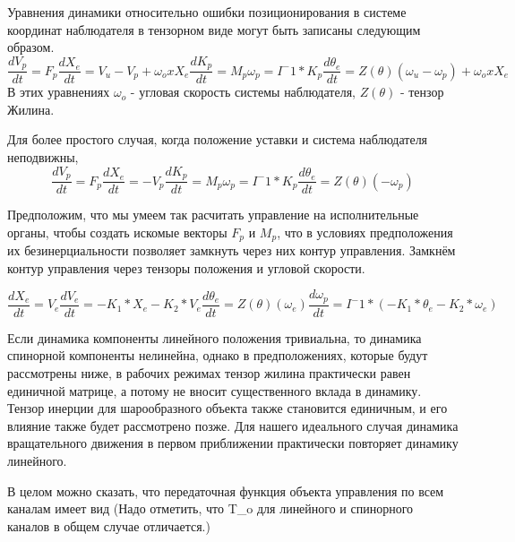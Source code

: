 \documentclass[a4paper]{article}
\begin{document}
Уравнения динамики относительно ошибки позиционирования в системе координат наблюдателя в тензорном виде могут быть записаны следующим образом.
\begin{equation}
\frac{dV_p}{dt} = F_p
\frac{dX_e}{dt} = V_u - V_p + \omega_o x X_e

\frac{dK_p}{dt} = M_p
\omega_p = I^-1 * K_p
\frac{d\theta_e}{dt} = Z(\theta)(\omega_u - \omega_p) + \omega_o x X_e
\end{equation}
В этих уравнениях $\omega_o$ - угловая скорость системы наблюдателя, $Z(\theta)$ - тензор Жилина. 

Для более простого случая, когда положение уставки и система наблюдателя неподвижны,   
\begin{equation}
\frac{dV_p}{dt} = F_p
\frac{dX_e}{dt} = - V_p

\frac{dK_p}{dt} = M_p
\omega_p = I^-1 * K_p
\frac{d\theta_e}{dt} = Z(\theta)(- \omega_p)
\end{equation}

Предположим, что мы умеем так расчитать управление на исполнительные органы, чтобы создать искомые векторы $F_p$ и $M_p$, что в условиях предположения их безинерциальности позволяет замкнуть через них контур управления. Замкнём контур управления через тензоры положения и угловой скорости.

 \begin{equation}
\frac{dX_e}{dt} = V_e
\frac{dV_e}{dt} = -K_1*X_e -K_2*V_e

\frac{d\theta_e}{dt} = Z(\theta)(\omega_e)
\frac{d\omega_p}{dt} = I^-1 * (-K_1*\theta_e -K_2*\omega_e)
\end{equation}

Если динамика компоненты линейного положения тривиальна, то динамика спинорной компоненты нелинейна, однако в
предположениях, которые будут рассмотрены ниже, в рабочих режимах тензор жилина практически равен единичной матрице, а потому не вносит существенного вклада в динамику. Тензор инерции для шарообразного объекта также становится единичным, и его влияние также будет рассмотрено позже. Для нашего идеального случая динамика вращательного движения в первом приближении практически повторяет динамику линейного.

В целом можно сказать, что передаточная функция объекта управления по всем каналам имеет вид 
 (Надо отметить, что T_o для линейного и спинорного каналов в общем случае отличается.)
\end{document}
